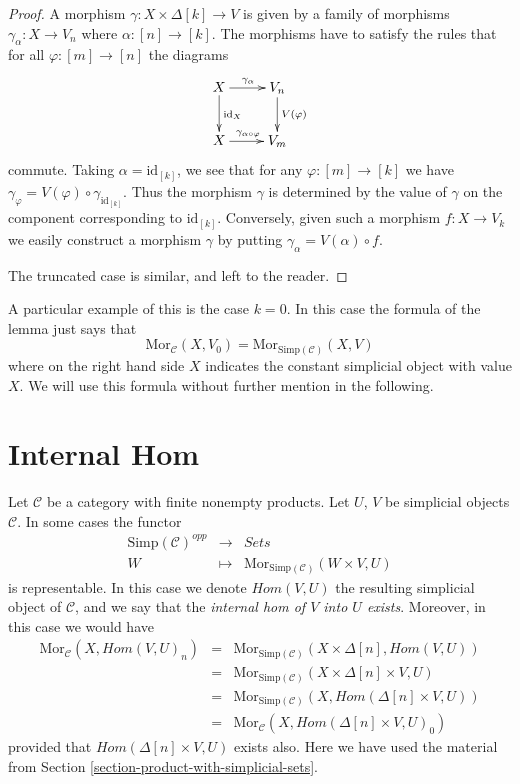 \begin{proof}
A morphism $\gamma : X \times \Delta[k] \to V$ is given by
a family of morphisms $\gamma_\alpha : X \to V_n$ where
$\alpha : [n] \to [k]$. The morphisms have to satisfy the
rules that for all $\varphi : [m] \to [n]$ the diagrams
$$
\xymatrix{
X \ar[r]^{\gamma_\alpha} \ar[d]^{\text{id}_X} & V_n \ar[d]^{V(\varphi)} \\
X \ar[r]^{\gamma_{\alpha \circ \varphi}} & V_m
}
$$
commute. Taking $\alpha = \text{id}_{[k]}$, we see that
for any $\varphi : [m] \to [k]$ we have $\gamma_\varphi =
V(\varphi) \circ \gamma_{\text{id}_{[k]}}$. Thus the morphism
$\gamma$ is determined by the value of $\gamma$ on the
component corresponding to $\text{id}_{[k]}$. Conversely,
given such a morphism $f : X \to V_k$ we easily
construct a morphism $\gamma$ by putting
$\gamma_\alpha = V(\alpha) \circ f$.

\medskip\noindent
The truncated case is similar, and left to the reader.
\end{proof}

\noindent
A particular example of this is the case $k = 0$.
In this case the formula of the lemma just says
that
$$
\text{Mor}_\mathcal{C}(X, V_0)
=
\text{Mor}_{\text{Simp}(\mathcal{C})}(X, V)
$$
where on the right hand side $X$ indicates the
constant simplicial object with value $X$. We will
use this formula without further mention in the
following.

\section{Internal Hom}
\label{section-internal-hom}

\noindent
Let $\mathcal{C}$ be a category with finite nonempty
products. Let $U$, $V$ be simplicial objects $\mathcal{C}$.
In some cases the functor
\begin{eqnarray*}
\text{Simp}(\mathcal{C})^{opp} & \longrightarrow & \textit{Sets} \\
W & \longmapsto & \text{Mor}_{\text{Simp}(\mathcal{C})}(W \times V, U)
\end{eqnarray*}
is representable. In this case we denote $\textit{Hom}(V, U)$
the resulting simplicial object of $\mathcal{C}$, and we say
that the {\it internal hom of $V$ into $U$ exists}. Moreover,
in this case we would have
\begin{eqnarray*}
\text{Mor}_{\mathcal{C}}(X, \textit{Hom}(V, U)_n)
& = &
\text{Mor}_{\text{Simp}(\mathcal{C})}(X \times \Delta[n], \textit{Hom}(V, U))
\\
& = &
\text{Mor}_{\text{Simp}(\mathcal{C})}(X \times \Delta[n]\times V, U) \\
& = &
\text{Mor}_{\text{Simp}(\mathcal{C})}(X, \textit{Hom}(\Delta[n] \times V, U))
\\
& = &
\text{Mor}_{\mathcal{C}}(X, \textit{Hom}(\Delta[n] \times V, U)_0)
\end{eqnarray*}
provided that $\textit{Hom}(\Delta[n] \times V, U)$
exists also. Here we have used the material from Section
\ref{section-product-with-simplicial-sets}.


